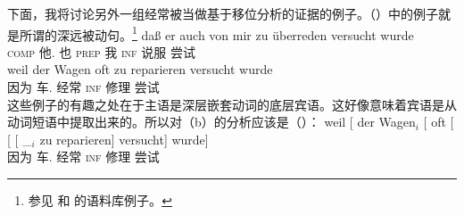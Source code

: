 下面，我将讨论另外一组经常被当做基于移位分析的证据的例子。（）中的例子就是所谓的深远被动句\citep[--176]{Hoehle78a}。\footnote{%
参见 和 的语料库例子。
}
\eal
\ex
\gll daß er auch von mir zu überreden versucht wurde\footnotemark\\
     \textsc{comp} 他.\nom{} 也 \textsc{prep} 我 \textsc{inf} 说服 尝试 \passivepst\\
\ex 
\gll weil    der Wagen oft zu reparieren versucht wurde\\
     因为  车.\nom{}   经常 \textsc{inf} 修理   尝试  \passivepst\\
\label{bsp-zu-reparieren-versucht-wurde}
\zl
这些例子的有趣之处在于主语是深层嵌套动词的底层宾语。这好像意味着宾语是从动词短语中提取出来的。所以对（b）的分析应该是（）：
\ea
\gll weil    [ der Wagen$_i$ [ oft   [ [ [ \_$_i$ zu reparieren] versucht] wurde]\\
     因为 {}         车.\nom{} {}        经常 {}        {}        {}        {}    \textsc{inf} 修理       尝试     \passivepst\\
